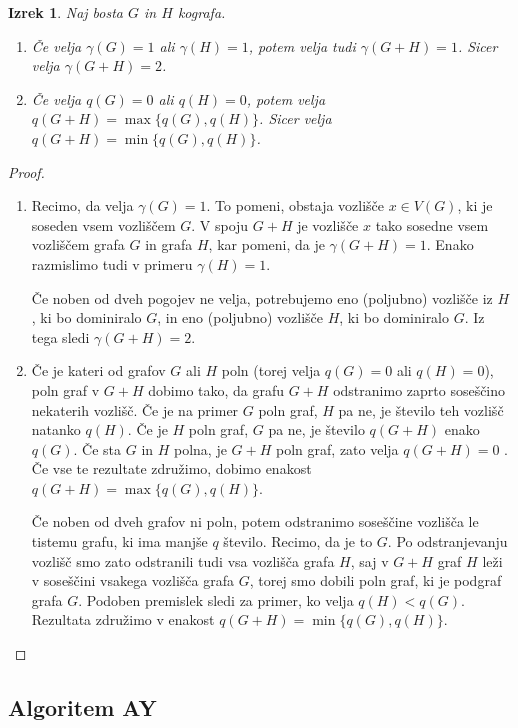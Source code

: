 \documentclass[12pt,a4paper,twoside]{article}
\theoremstyle{definition} %
\theoremstyle{plain} %
\newtheorem{izrek}[definicija]{Izrek}
\numberwithin{equation}{section}  %
\begin{document}
\begin{izrek} \label{theorem4.6}
Naj bosta $G$ in $H$ kografa.
\begin{enumerate}[label=(\roman*)]
\item Če velja $\gamma(G) = 1$ ali $\gamma(H) = 1$, potem velja tudi $\gamma(G + H) = 1$. Sicer velja $\gamma(G + H) = 2$.
\item Če velja $q(G) = 0$ ali $q(H) = 0$, potem velja $q(G + H) = \max\{q(G), q(H)\}$. Sicer velja $q(G + H) = \min\{q(G), q(H)\}$.
\end{enumerate}
\end{izrek}
\begin{proof}
\begin{enumerate}[label=($\roman*)$]
\item Recimo, da velja $\gamma(G) = 1$. To pomeni, obstaja vozlišče $x \in V(G)$, ki je soseden vsem vozliščem $G$. V spoju $G + H$ je vozlišče $x$ tako sosedne vsem vozliščem grafa $G$ in grafa $H$, kar pomeni, da je $\gamma(G + H) = 1$. Enako razmislimo tudi v primeru $\gamma(H) = 1$.

Če noben od dveh pogojev ne velja, potrebujemo eno (poljubno) vozlišče iz $H$, ki bo dominiralo $G$, in eno (poljubno) vozlišče $H$, ki bo dominiralo $G$. Iz tega sledi $\gamma(G + H) = 2$.
\item Če je kateri od grafov $G$ ali $H$ poln (torej velja $q(G) = 0$ ali $q(H) = 0$), poln graf v $G + H$ dobimo tako, da grafu $G + H$ odstranimo zaprto soseščino nekaterih vozlišč. Če je na primer $G$ poln graf, $H$ pa ne, je število teh vozlišč natanko $q(H)$. Če je $H$ poln graf, $G$ pa ne, je število $q(G + H)$ enako $q(G)$. Če sta $G$ in $H$ polna, je $G + H$ poln graf, zato velja $q(G + H) = 0$ . Če vse te rezultate združimo, dobimo enakost $q(G + H) = \max\{q(G), q(H)\}$.

Če noben od dveh grafov ni poln, potem odstranimo soseščine vozlišča le tistemu grafu, ki ima manjše $q$ število. Recimo, da je to $G$. Po odstranjevanju vozlišč smo zato odstranili tudi vsa vozlišča grafa $H$, saj v $G + H$ graf $H$ leži v soseščini vsakega vozlišča grafa $G$, torej smo dobili poln graf, ki je podgraf grafa $G$. Podoben premislek sledi za primer, ko velja $q(H) < q(G)$. Rezultata združimo v enakost $q(G + H) = \min\{q(G), q(H)\}$.
\end{enumerate}
\end{proof}

\subsection{Algoritem AY}
\end{document}
